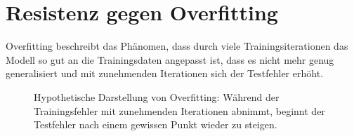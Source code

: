 \section{Resistenz gegen Overfitting}
Overfitting beschreibt das Phänomen, dass durch viele Trainingsiterationen das Modell so gut an die Trainingsdaten angepasst ist, dass es nicht mehr genug generalisiert und mit zunehmenden Iterationen sich der Testfehler erhöht.

\begin{figure}[H]
    \centering
    \caption[Hypothetische Darstellung von Overfitting]{Hypothetische Darstellung von Overfitting: Während der Trainingsfehler mit zunehmenden Iterationen abnimmt, beginnt der Testfehler nach einem gewissen Punkt wieder zu steigen.}
\end{figure}


